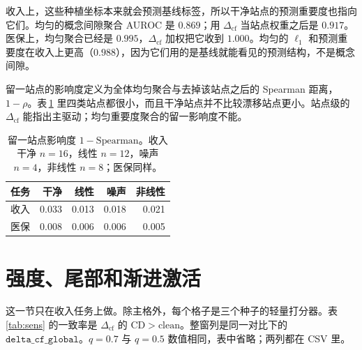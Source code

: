 \documentclass[11pt,a4paper,fontset=none]{ctexart}
\newcommand{\Dcf}{\ensuremath{\Delta_{\mathrm{cf}}}}
\begin{document}
收入上，这些种植坐标本来就会预测基线标签，所以干净站点的预测重要度也指向它们。均匀的概念间隙聚合 AUROC 是 \(0.869\)；用 \(\Dcf\) 当站点权重之后是 \(0.917\)。医保上，均匀聚合已经是 \(0.995\)，\(\Dcf\) 加权把它收到 \(1.000\)。均匀的 \(\ell_1\) 和预测重要度在收入上更高（\(0.988\)），因为它们用的是基线就能看见的预测结构，不是概念间隙。

留一站点的影响度定义为全体均匀聚合与去掉该站点之后的 Spearman 距离，\(1-\rho\)。表\,\ref{tab:loso} 里四类站点都很小，而且干净站点并不比较漂移站点更小。站点级的 \(\Dcf\) 能指出主驱动；均匀重要度聚合的留一影响度不能。

\begin{table}[ht]
\centering
\caption{留一站点影响度 \(1-\mathrm{Spearman}\)。收入干净 \(n=16\)，线性 \(n=12\)，噪声 \(n=4\)，非线性 \(n=8\)；医保同样。}
\label{tab:loso}
\small
\begin{tabular}{@{}lrrrr@{}}
\toprule
任务 & 干净 & 线性 & 噪声 & 非线性 \\
\midrule
收入 & 0.033 & 0.013 & 0.018 & 0.021 \\
医保 & 0.008 & 0.006 & 0.006 & 0.005 \\
\bottomrule
\end{tabular}
\end{table}

\FloatBarrier
\section{强度、尾部和渐进激活}

这一节只在收入任务上做。除主格外，每个格子是三个种子的轻量打分器。表\,\ref{tab:sens} 的一致率是 \(\Dcf\) 的 \(\mathrm{CD}>\mathrm{clean}\)。整窗列是同一对比下的 \(\texttt{delta\_cf\_global}\)。\(q=0.7\) 与 \(q=0.5\) 数值相同，表中省略；两列都在 CSV 里。
\end{document}
